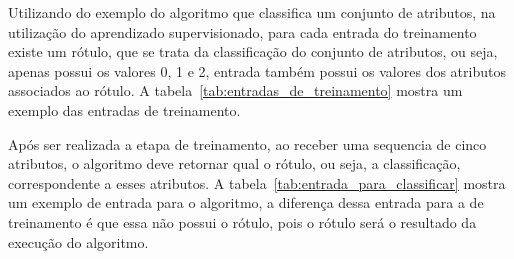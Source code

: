Utilizando do exemplo do algoritmo que classifica um conjunto de atributos,
na utilização do aprendizado supervisionado, para cada entrada do treinamento
existe um rótulo, que se trata da classificação do conjunto de atributos, ou
seja, apenas possui os valores 0, 1 e 2, entrada também possui os valores dos
atributos associados ao rótulo. A tabela~\ref{tab:entradas_de_treinamento}
mostra um exemplo das entradas de treinamento.

\begin{table}[h]
\centering
{}
\caption{Entradas de treinamento para o aprendizado de máquina}
\label{tab:entradas_de_treinamento}
\end{table}

Após ser realizada a etapa de treinamento, ao receber uma sequencia de cinco
atributos, o algoritmo deve retornar qual o rótulo, ou seja, a classificação,
correspondente a esses atributos. A tabela~\ref{tab:entrada_para_classificar}
mostra um exemplo de entrada para o algoritmo, a diferença dessa entrada para
a de treinamento é que essa não possui o rótulo, pois o rótulo será o resultado
da execução do algoritmo.

\begin{table}[h]
\centering
{}
\caption{Entrada de dados para o algoritmo determinar o rótulo}
\label{tab:entrada_para_classificar}
\end{table}


